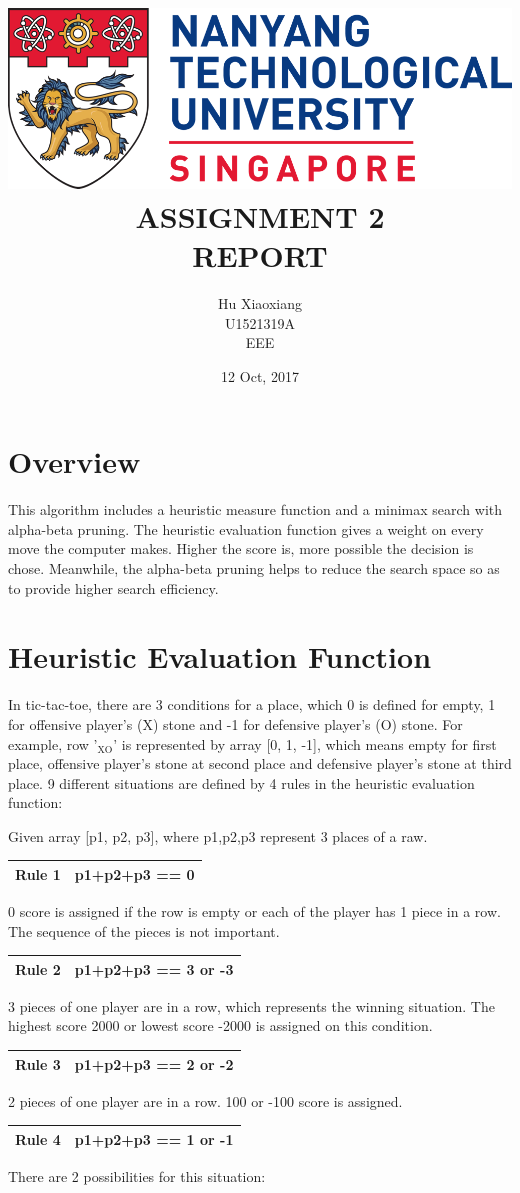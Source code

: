 \documentclass[titlepage]{article}
\author{Hu Xiaoxiang \\
U1521319A \\
EEE \\
}
\date{12 Oct, 2017 \\
}
\title{\includegraphics[width=\textwidth]{logo_ntu_new.png} \\
[5\baselineskip] ASSIGNMENT 2 \\
REPORT \\
[5\baselineskip]}
\begin{document}
\maketitle
\tableofcontents

\newpage
{}

\section{Overview}
\label{sec:orgd633083}
This algorithm includes a heuristic measure function and a minimax search with
alpha-beta pruning. The heuristic evaluation function gives a weight on every
move the computer makes. Higher the score is, more possible the decision is
chose. Meanwhile, the alpha-beta pruning helps to reduce the search space so
as to provide higher search efficiency.

\section{Heuristic Evaluation Function}
\label{sec:org29fa332}
In tic-tac-toe, there are 3 conditions for a place, which 0 is defined for
empty, 1 for offensive player's (X) stone and -1 for defensive player's (O)
stone. For example, row '\(_{\text{XO}}\)' is represented by array [0, 1, -1], which means
empty for first place, offensive player's stone at second place and defensive
player's stone at third place. 9 different situations are defined by 4 rules
in the heuristic evaluation function:

Given array [p1, p2, p3], where p1,p2,p3 represent 3 places of a raw. 
\begin{center}
\begin{tabular}{ll}
\hline
Rule 1 & p1+p2+p3 == 0\\
\hline
\end{tabular}
\end{center}
0 score is assigned if the row is empty or each of the player has 1 piece in a
row. The sequence of the pieces is not important.
\begin{center}
\begin{tabular}{ll}
\hline
Rule 2 & p1+p2+p3 == 3 or -3\\
\hline
\end{tabular}
\end{center}
3 pieces of one player are in a row, which represents the winning situation.
The highest score 2000 or lowest score -2000 is assigned on this condition.
\begin{center}
\begin{tabular}{ll}
\hline
Rule 3 & p1+p2+p3 == 2 or -2\\
\hline
\end{tabular}
\end{center}
2 pieces of one player are in a row. 100 or -100 score is assigned. 
\begin{center}
\begin{tabular}{ll}
\hline
Rule 4 & p1+p2+p3 == 1 or -1\\
\hline
\end{tabular}
\end{center}
There are 2 possibilities for this situation: 
\end{document}
